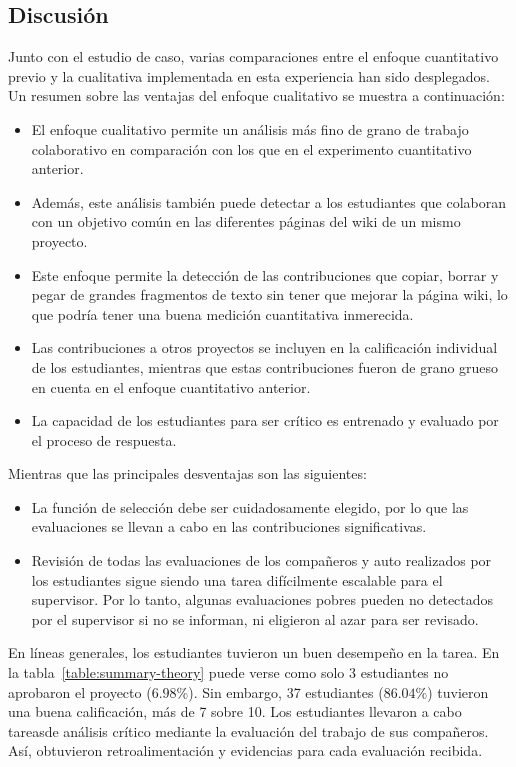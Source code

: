 \subsection{Discusión} %

Junto con el estudio de caso, varias comparaciones entre el enfoque cuantitativo previo y la cualitativa implementada en esta experiencia han sido desplegados. Un resumen sobre las ventajas del enfoque cualitativo se muestra a continuación:

\begin{itemize}
\item El enfoque cualitativo permite un análisis más fino de grano de trabajo colaborativo en comparación con los que en el experimento cuantitativo anterior.
\item Además, este análisis también puede detectar a los estudiantes que colaboran con un objetivo común en las diferentes páginas del wiki de un mismo proyecto.
\item Este enfoque permite la detección de las contribuciones que copiar, borrar y pegar de grandes fragmentos de texto sin tener que mejorar la página wiki, lo que podría tener una buena medición cuantitativa inmerecida.
\item Las contribuciones a otros proyectos se incluyen en la calificación individual de los estudiantes, mientras que estas contribuciones fueron de grano grueso en cuenta en el enfoque cuantitativo anterior.
\item La capacidad de los estudiantes para ser crítico es entrenado y evaluado por el proceso de respuesta.
\end{itemize}

Mientras que las principales desventajas son las siguientes:

\begin {itemize}
\item La función de selección debe ser cuidadosamente elegido, por lo que las evaluaciones se llevan a cabo en las contribuciones significativas.
\item Revisión de todas las evaluaciones de los compañeros y auto realizados por los estudiantes sigue siendo una tarea difícilmente escalable para el supervisor. Por lo tanto, algunas evaluaciones pobres pueden no detectados por el supervisor si no se informan, ni eligieron al azar para ser revisado.
\end {itemize}

En líneas generales, los estudiantes tuvieron un buen desempeño en la tarea. En la tabla~\ref{table:summary-theory} puede verse como solo 3 estudiantes no aprobaron el proyecto ($6.98\%$). Sin embargo, 37 estudiantes ($86.04\%$) tuvieron una buena calificación, más de 7 sobre 10. Los estudiantes llevaron a cabo tareasde análisis crítico mediante la evaluación del trabajo de sus compañeros. Así, obtuvieron retroalimentación y evidencias para cada evaluación recibida.

